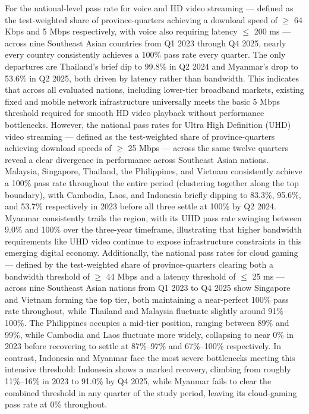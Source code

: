 \documentclass[sigconf,anonymous,review]{acmart}
\begin{document}
For the national-level pass rate for voice and HD video streaming ---
defined as the test-weighted share of province-quarters achieving a
download speed of $\geq$ 64 Kbps and 5 Mbps respectively, with voice also
requiring latency $\leq$ 200 ms --- across nine Southeast Asian countries
from Q1 2023 through Q4 2025, nearly every country consistently achieves a
100\% pass rate every quarter. The only departures are Thailand's brief dip
to 99.8\% in Q2 2024 and Myanmar's drop to 53.6\% in Q2 2025, both driven by
latency rather than bandwidth. This indicates that across all evaluated
nations, including lower-tier broadband markets, existing fixed and mobile
network infrastructure universally meets the basic 5 Mbps threshold
required for smooth HD video playback without performance bottlenecks.
However, the national pass rates for Ultra High Definition (UHD) video
streaming --- defined as the test-weighted share of province-quarters
achieving download speeds of $\geq$ 25 Mbps --- across the same twelve
quarters reveal a clear divergence in performance across Southeast Asian
nations. Malaysia, Singapore, Thailand, the Philippines, and Vietnam
consistently achieve a 100\% pass rate throughout the entire period
(clustering together along the top boundary), with Cambodia, Laos, and
Indonesia briefly dipping to 83.3\%, 95.6\%, and 53.7\% respectively in
2023 before all three settle at 100\% by Q2 2024. Myanmar consistently trails
the region, with its UHD pass rate swinging between 9.0\% and 100\% over
the three-year timeframe, illustrating that higher bandwidth requirements
like UHD video continue to expose infrastructure constraints in this
emerging digital economy. Additionally, the national pass rates for cloud
gaming --- defined by the test-weighted share of province-quarters
clearing both a bandwidth threshold of $\geq$ 44 Mbps and a latency
threshold of $\leq$ 25 ms --- across nine Southeast Asian nations from Q1
2023 to Q4 2025 show Singapore and Vietnam forming the top tier, both
maintaining a near-perfect 100\% pass rate throughout, while Thailand and
Malaysia fluctuate slightly around 91\%--100\%. The Philippines occupies a
mid-tier position, ranging between 89\% and 99\%, while Cambodia and Laos
fluctuate more widely, collapsing to near 0\% in 2023 before recovering to
settle at 87\%--97\% and 67\%--100\% respectively. In contrast, Indonesia
and Myanmar face the most severe bottlenecks meeting this intensive
threshold: Indonesia shows a marked recovery, climbing from roughly
11\%--16\% in 2023 to 91.0\% by Q4 2025, while Myanmar fails to clear the
combined threshold in any quarter of the study period, leaving its
cloud-gaming pass rate at 0\%
throughout.
\end{document}
